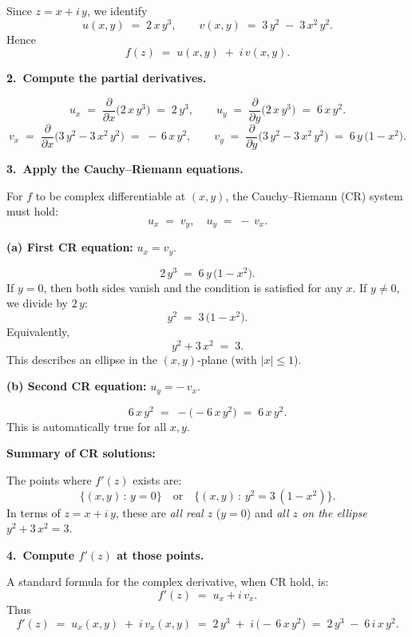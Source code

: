 \documentclass[12pt]{article}
\theoremstyle{definition} %
\theoremstyle{plain} %
\begin{document}
Since $z = x + i\,y$, we identify
\[
u(x,y) \;=\; 2\,x\,y^{3}, 
\qquad
v(x,y) \;=\; 3\,y^{2} \;-\; 3\,x^{2}\,y^{2}.
\]
Hence
\[
f(z) \;=\; u(x,y) \;+\; i\,v(x,y).
\]

\bigskip

\noindent
\textbf{2.\ Compute the partial derivatives.}

\[
u_x 
\;=\; \frac{\partial}{\partial x}\bigl(2\,x\,y^{3}\bigr)
\;=\; 2\,y^{3},
\qquad
u_y 
\;=\; \frac{\partial}{\partial y}\bigl(2\,x\,y^{3}\bigr)
\;=\; 6\,x\,y^{2}.
\]
\[
v_x 
\;=\; \frac{\partial}{\partial x}\bigl(3\,y^{2} - 3\,x^{2}\,y^{2}\bigr)
\;=\; -\,6\,x\,y^{2},
\qquad
v_y 
\;=\; \frac{\partial}{\partial y}\bigl(3\,y^{2} - 3\,x^{2}\,y^{2}\bigr)
\;=\; 6\,y\,\bigl(1 - x^{2}\bigr).
\]

\bigskip

\noindent
\textbf{3.\ Apply the Cauchy--Riemann equations.}

For $f$ to be complex differentiable at $(x,y)$, the Cauchy--Riemann (CR) system must hold:
\[
u_x \;=\; v_y,
\quad
u_y \;=\; -\,v_x.
\]

\smallskip
\noindent
\textbf{(a) First CR equation: } $u_x = v_y.$

\[
2\,y^{3}
\;=\;
6\,y\,\bigl(1 - x^{2}\bigr).
\]
If $y=0$, then both sides vanish and the condition is satisfied for any $x$.  If $y \neq 0$, we divide by $2\,y$:
\[
y^{2}
\;=\;
3\,\bigl(1 - x^{2}\bigr).
\]
Equivalently,
\[
y^{2} + 3\,x^{2} 
\;=\;
3.
\]
This describes an ellipse in the $(x,y)$-plane (with $|x|\le 1$).

\smallskip
\noindent
\textbf{(b) Second CR equation: } $u_y = -\,v_x.$

\[
6\,x\,y^{2}
\;=\;
-\bigl(-6\,x\,y^{2}\bigr)
\;=\;
6\,x\,y^{2}.
\]
This is automatically true for all $x,y$.  

\smallskip
\noindent
\textbf{Summary of CR solutions:}

The points where $f'(z)$ exists are:
\[
\bigl\{ (x,y) \,:\, y=0 \bigr\}
\quad\text{or}\quad
\bigl\{ (x,y) \,:\, y^{2} = 3\,(1 - x^{2}) \bigr\}.
\]
In terms of $z = x+ i\,y$, these are \textit{all real $z$} ($y=0$) and \textit{all $z$ on the ellipse} $y^{2} + 3\,x^{2} = 3$.

\bigskip

\noindent
\textbf{4.\ Compute $f'(z)$ at those points.}

A standard formula for the complex derivative, when CR hold, is:
\[
f'(z) 
\;=\; u_x + i\,v_x.
\]
Thus
\[
f'(z)
\;=\;
u_x(x,y) 
\;+\;
i\,v_x(x,y)
\;=\;
2\,y^{3}
\;+\;
i\,\bigl(-\,6\,x\,y^{2}\bigr)
\;=\;
2\,y^{3}
\;-\;
6\,i\,x\,y^{2}.
\]
\end{document}
